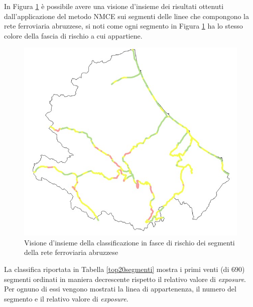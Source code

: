In Figura \ref{rankinglinee} è possibile avere una visione d'insieme dei risultati ottenuti dall'applicazione del metodo NMCE sui segmenti delle linee che compongono la rete ferroviaria abruzzese, si noti come ogni segmento in Figura \ref{rankinglinee} ha lo stesso colore della fascia di rischio a cui appartiene.
\begin{figure}[hpt]
	\centering
	\includegraphics[width=0.4\linewidth]{img/reteRanking.jpeg}
	\caption{Visione d'insieme della classificazione in fasce di rischio dei segmenti della rete ferroviaria abruzzese}
	\label{rankinglinee}
\end{figure}
\newline
La classifica riportata in Tabella \ref{top20segmenti} mostra i primi venti (di $690$) segmenti ordinati in maniera decrescente rispetto il relativo valore di \textit{exposure}. Per ognuno di essi vengono mostrati la linea di appartenenza, il numero del segmento e il relativo valore di \textit{exposure}.
